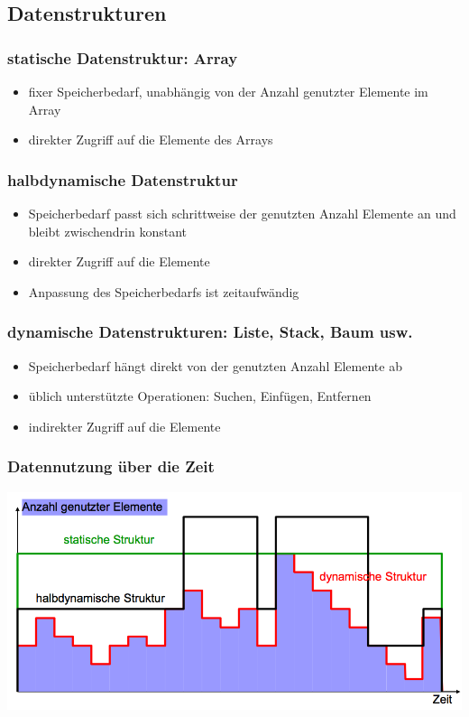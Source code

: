 \documentclass[a4paper,10pt]{article}
\begin{document}
\subsection{Datenstrukturen}

\subsubsection{statische Datenstruktur: Array}
\begin{itemize}
	\item fixer Speicherbedarf, unabh\"angig von der Anzahl genutzter Elemente im Array
	\item direkter Zugriff auf die Elemente des Arrays
\end{itemize}

\subsubsection{halbdynamische Datenstruktur}
\begin{itemize}
	\item Speicherbedarf passt sich schrittweise der genutzten Anzahl Elemente an und bleibt zwischendrin konstant
	\item direkter Zugriff auf die Elemente
	\item Anpassung des Speicherbedarfs ist zeitaufw\"andig
\end{itemize}

\subsubsection{dynamische Datenstrukturen: Liste, Stack, Baum usw.}
\begin{itemize}
	\item Speicherbedarf h\"angt direkt von der genutzten Anzahl Elemente ab
	\item \"ublich unterst\"utzte Operationen: Suchen, Einf\"ugen, Entfernen
	\item indirekter Zugriff auf die Elemente
\end{itemize}

\subsubsection{Datennutzung \"uber die Zeit}
\includegraphics[width=150mm]{datennutzung_ueber_zeit.png}
\end{document}
